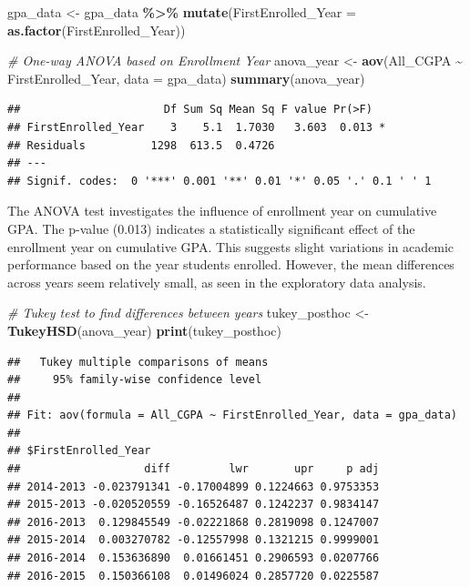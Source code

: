 \documentclass[
  12pt,
]{article}
\newenvironment{Shaded}{\begin{snugshade}}{\end{snugshade}}
\newcommand{\AttributeTok}[1]{\textcolor[rgb]{0.13,0.29,0.53}{#1}}
\newcommand{\CommentTok}[1]{\textcolor[rgb]{0.56,0.35,0.01}{\textit{#1}}}
\newcommand{\FunctionTok}[1]{\textcolor[rgb]{0.13,0.29,0.53}{\textbf{#1}}}
\newcommand{\NormalTok}[1]{#1}
\newcommand{\OtherTok}[1]{\textcolor[rgb]{0.56,0.35,0.01}{#1}}
\newcommand{\SpecialCharTok}[1]{\textcolor[rgb]{0.81,0.36,0.00}{\textbf{#1}}}
\begin{document}
\begin{Shaded}
\begin{Highlighting}[]
\NormalTok{gpa\_data }\OtherTok{\textless{}{-}}\NormalTok{ gpa\_data }\SpecialCharTok{\%\textgreater{}\%}
    \FunctionTok{mutate}\NormalTok{(}\AttributeTok{FirstEnrolled\_Year =} \FunctionTok{as.factor}\NormalTok{(FirstEnrolled\_Year))}

\CommentTok{\# One{-}way ANOVA based on Enrollment Year}
\NormalTok{anova\_year }\OtherTok{\textless{}{-}} \FunctionTok{aov}\NormalTok{(All\_CGPA }\SpecialCharTok{\textasciitilde{}}\NormalTok{ FirstEnrolled\_Year, }\AttributeTok{data =}\NormalTok{ gpa\_data)}
\FunctionTok{summary}\NormalTok{(anova\_year)}
\end{Highlighting}
\end{Shaded}

\begin{verbatim}
##                      Df Sum Sq Mean Sq F value Pr(>F)  
## FirstEnrolled_Year    3    5.1  1.7030   3.603  0.013 *
## Residuals          1298  613.5  0.4726                 
## ---
## Signif. codes:  0 '***' 0.001 '**' 0.01 '*' 0.05 '.' 0.1 ' ' 1
\end{verbatim}

The ANOVA test investigates the influence of enrollment year on
cumulative GPA. The p-value (0.013) indicates a statistically
significant effect of the enrollment year on cumulative GPA. This
suggests slight variations in academic performance based on the year
students enrolled. However, the mean differences across years seem
relatively small, as seen in the exploratory data analysis.

\begin{Shaded}
\begin{Highlighting}[]
\CommentTok{\# Tukey test to find differences between years}
\NormalTok{tukey\_posthoc }\OtherTok{\textless{}{-}} \FunctionTok{TukeyHSD}\NormalTok{(anova\_year)}
\FunctionTok{print}\NormalTok{(tukey\_posthoc)}
\end{Highlighting}
\end{Shaded}

\begin{verbatim}
##   Tukey multiple comparisons of means
##     95% family-wise confidence level
## 
## Fit: aov(formula = All_CGPA ~ FirstEnrolled_Year, data = gpa_data)
## 
## $FirstEnrolled_Year
##                   diff         lwr       upr     p adj
## 2014-2013 -0.023791341 -0.17004899 0.1224663 0.9753353
## 2015-2013 -0.020520559 -0.16526487 0.1242237 0.9834147
## 2016-2013  0.129845549 -0.02221868 0.2819098 0.1247007
## 2015-2014  0.003270782 -0.12557998 0.1321215 0.9999001
## 2016-2014  0.153636890  0.01661451 0.2906593 0.0207766
## 2016-2015  0.150366108  0.01496024 0.2857720 0.0225587
\end{verbatim}
\end{document}
